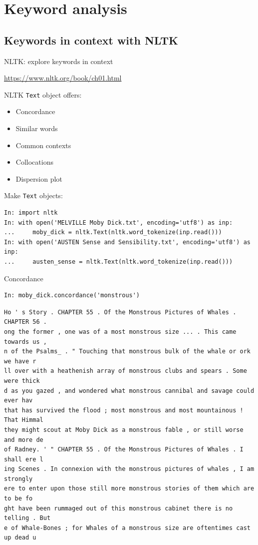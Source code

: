 \documentclass[aspectratio=169,usenames,dvipsnames]{beamer}
\begin{document}
\section{Keyword analysis}
\subsection{Keywords in context with NLTK}
\frame{\tableofcontents[currentsection]}

\begin{frame}[fragile]{NLTK: explore keywords in context}
    \begin{reference}
        \url{https://www.nltk.org/book/ch01.html}
    \end{reference}
    NLTK \texttt{Text} object offers:
    \begin{itemize}
        \item Concordance
        \item Similar words
        \item Common contexts
        \item Collocations
        \item Dispersion plot
    \end{itemize}
Make \texttt{Text} objects:
\begin{lstlisting}
In: import nltk
In: with open('MELVILLE Moby Dick.txt', encoding='utf8') as inp:
...     moby_dick = nltk.Text(nltk.word_tokenize(inp.read()))
In: with open('AUSTEN Sense and Sensibility.txt', encoding='utf8') as inp:
...     austen_sense = nltk.Text(nltk.word_tokenize(inp.read()))
\end{lstlisting}
\end{frame}

\begin{frame}[fragile]{Concordance}
\begin{lstlisting}
In: moby_dick.concordance('monstrous')
\end{lstlisting}
\begin{lstlisting}[style=plain]
Ho ' s Story . CHAPTER 55 . Of the Monstrous Pictures of Whales . CHAPTER 56 .
ong the former , one was of a most monstrous size ... . This came towards us ,
n of the Psalms_ . " Touching that monstrous bulk of the whale or ork we have r
ll over with a heathenish array of monstrous clubs and spears . Some were thick
d as you gazed , and wondered what monstrous cannibal and savage could ever hav
that has survived the flood ; most monstrous and most mountainous ! That Himmal
they might scout at Moby Dick as a monstrous fable , or still worse and more de
of Radney. ' " CHAPTER 55 . Of the Monstrous Pictures of Whales . I shall ere l
ing Scenes . In connexion with the monstrous pictures of whales , I am strongly
ere to enter upon those still more monstrous stories of them which are to be fo
ght have been rummaged out of this monstrous cabinet there is no telling . But
e of Whale-Bones ; for Whales of a monstrous size are oftentimes cast up dead u
\end{lstlisting}
\end{frame}
\end{document}
